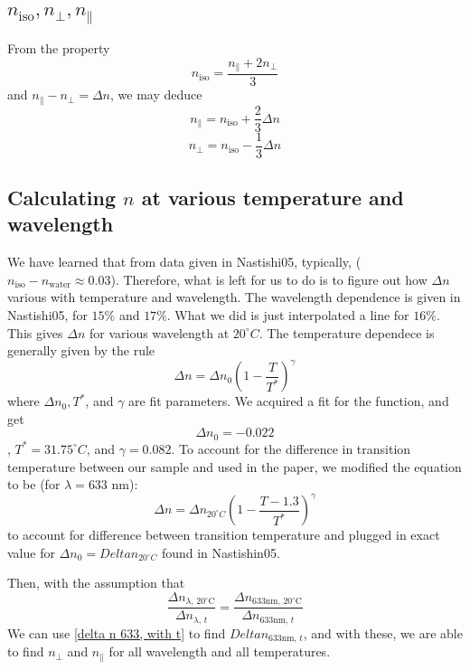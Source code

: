\documentclass[11pt]{article}
\begin{document}
\subsection*{$n_{\text{iso}}, n_{\perp}, n_{\parallel}$}
From the property 
\begin{equation}
    n_{\text{iso}} = \frac{n_{\parallel}+2n_{\perp}}{3}
\end{equation}
and $n_{\parallel} - n_{\perp} = \Delta n$, we may deduce
\begin{equation}
    \boxed{n_{\parallel} = n_{\text{iso}} + \frac{2}{3} \Delta n}
\end{equation}
\begin{equation}
    \boxed{n_{\perp} = n_{\text{iso}} -\frac{1}{3} \Delta n}
\end{equation}

\subsection*{Calculating $n$ at various temperature and wavelength}
We have learned that from data given in Nastishi05, typically, ($n_{\text{iso}}-n_{\text{water}}\approx 0.03$).
Therefore, what is left for us to do is to figure out how $\Delta n$ various with temperature and wavelength. The wavelength dependence is given in
Nastishi05, for $15\%$ and $17\%$. What we did is just interpolated a line for $16\%$. This gives $\Delta n$ for various wavelength at $20^\circ C$. 
The temperature dependece is generally given by the rule 
\begin{equation}
    \Delta n = \Delta n_0 (1-\frac{T}{T^*})^{\gamma}
\end{equation}
where $\Delta n_0, T^{*}$, and $\gamma$ are fit parameters. We acquired a fit for the function, and get 
\[\Delta n_0 = -0.022\], $T^* = 31.75^\circ C$, and $\gamma = 0.082$. 
To account for the difference in transition temperature between our sample
and used in the paper, we modified the equation to be (for $\lambda=633$ nm):
\begin{equation}
    \Delta n = \Delta n_{20^\circ C} (1-\frac{T-1.3}{T^*})^{\gamma} \label{delta n 633, with t}
\end{equation}
to account for difference between transition temperature and plugged in exact value for $\Delta n_0 = Delta n_{20^\circ C}$ found in Nastishin05.

Then, with the assumption that 
\begin{equation}
    \frac{\Delta n_{\lambda\text{, } 20^\circ\text{C}}}{\Delta n_{\lambda\text{, } t}}=
    \frac{\Delta n_{633\text{nm, } 20^\circ\text{C}}}{\Delta n_{633\text{nm, } t}} \label{generalize delta n for different wavelength to temperature}
\end{equation}
We can use \ref{delta n 633, with t} to find $Delta n_{633\text{nm, } t}$, and with these, we are able to find $n_\perp$ and $n_\parallel$ for all wavelength and all temperatures. 
\end{document}
